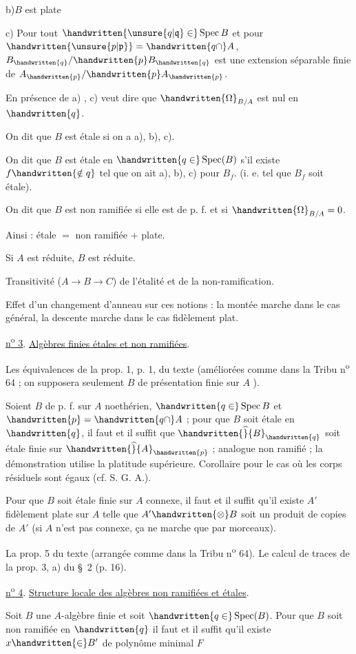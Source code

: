 b)\quad $B$ est plate

c) Pour tout $\handwritten{\unsure{q|\mathfrak{q}}\in}\operatorname{Spec} B$ et pour $\handwritten{\unsure{p|\mathfrak{p}}}= \handwritten{q\cap}A$, $B_{\handwritten{q}}/\handwritten{p}B_{\handwritten{q}}$ est une extension
séparable finie de $A_{\handwritten{p}}/\handwritten{p}A_{\handwritten{p}}$.

En présence de a) , c) veut dire que $\handwritten{\Omega}_{B/A}$ est nul en $\handwritten{q}$.

On dit que $B$ est étale si on a a), b), c).

On dit que $B$ est étale en $\handwritten{q\in}\operatorname{Spec}(B)$ s'il existe $f\handwritten{\notin q}$ tel que on ait a),
b), c) pour $B_f$. (i. e. tel que $B_f$ soit étale).

On dit que $B$ est non ramifiée si elle est de p. f. et si $\handwritten{\Omega}_{B/A}=0$.

Ainsi : étale $=$ non ramifiée $+$ plate.

Si $A$ est réduite, $B$ est réduite.

Transitivité ($A\longrightarrow B\longrightarrow C$) de l'étalité et de la non-ramification.

Effet d'un changement d'anneau sur ces notions : la montée marche dans le cas
général, la descente marche dans le cas fidèlement plat.

\uline{n\textsuperscript{o} 3}. \uline{Algèbres finies étales et non ramifiées}.

Les équivalences de la prop. 1, p. 1, du texte (améliorées comme dans la Tribu
n\textsuperscript{o} 64 ; on supposera seulement $B$ de présentation finie sur $A$ ).

Soient $B$ de p. f. sur $A$ noethérien, $\handwritten{q\in}\operatorname{Spec} B$ et $\handwritten{p}=\handwritten{q\cap} A$ ; pour
que $B$ soit étale en $\handwritten{q}$, il faut et il suffit que $\handwritten{\widehat}{B}_{\handwritten{q}}$ soit étale finie sur
$\handwritten{\widehat}{A}_{\handwritten{p}}$ ; analogue non ramifié ; la démonstration utilise la platitude supérieure. Corollaire pour le cas où les corps résiduels sont égaux (cf. S. G. A.).

Pour que $B$ soit étale finie sur $A$ connexe, il faut et il suffit qu'il existe
$A'$ fidèlement plate sur $A$ telle que $A'\handwritten{\otimes}B$ soit un produit de copies de $A'$
(si $A$ n'est pas connexe, ça ne marche que par morceaux).

La prop. 5 du texte (arrangée comme dans la Tribu n\textsuperscript{o} 64). Le calcul de traces de
la prop. 3, a) du \S~2 (p. 16).

\uline{n\textsuperscript{o} 4}. \uline{Structure locale des algèbres non ramifiées et étales}.

Soit $B$ une $A$-algèbre finie et soit $\handwritten{q\in}\operatorname{Spec}(B)$. Pour que $B$ soit non
ramifiée en $\handwritten{q}$ il faut et il suffit qu'il existe $x\handwritten{\in} B'$ de polynôme minimal $F$
